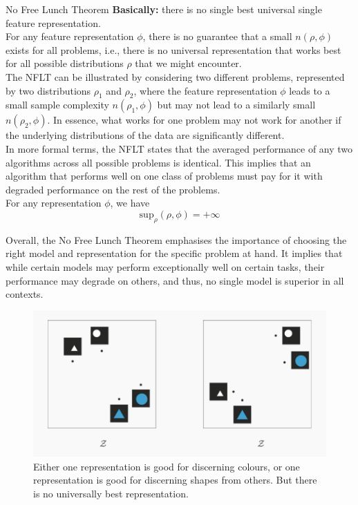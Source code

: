 \begin{theorembox}{No Free Lunch Theorem}
\textbf{Basically: }there is no single best universal single feature representation. \\

For any feature representation \( \phi \), there is no guarantee that a small \( n(\rho, \phi) \) exists for all problems, i.e., there is no universal representation that works best for all possible distributions \( \rho \) that we might encounter.\\


The NFLT can be illustrated by considering two different problems, represented by two distributions \( \rho_1 \) and \( \rho_2 \), where the feature representation \( \phi \) leads to a small sample complexity \( n(\rho_1, \phi) \) but may not lead to a similarly small \( n(\rho_2, \phi) \). In essence, what works for one problem may not work for another if the underlying distributions of the data are significantly different.\\

In more formal terms, the NFLT states that the averaged performance of any two algorithms across all possible problems is identical. This implies that an algorithm that performs well on one class of problems must pay for it with degraded performance on the rest of the problems.\\

For any representation $\phi$, we have
\begin{equation}
    \text{sup}_\rho(\rho, \phi)= +\infty
\end{equation}


Overall, the No Free Lunch Theorem emphasises the importance of choosing the right model and representation for the specific problem at hand. It implies that while certain models may perform exceptionally well on certain tasks, their performance may degrade on others, and thus, no single model is superior in all contexts.\\

    \begin{figure}[H]
        \centering
        \includegraphics[width=0.65\linewidth]{img/no_free_lunch.png}
        \caption{Either one representation is good for discerning colours, or one representation is good for discerning shapes from others. But there is no universally best representation.}
    \end{figure}
\end{theorembox}

